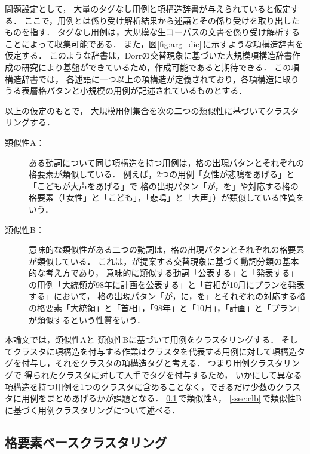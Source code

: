 問題設定として，
大量のタグなし用例と項構造辞書が与えられていると仮定する．
ここで，用例とは係り受け解析結果から述語とその係り受けを取り出したものを指す．
タグなし用例は，大規模な生コーパスの文書を係り受け解析することによって収集可能である．
また，図\ref{fig:arg_dic}\,に示すような項構造辞書を仮定する．
このような辞書は，Dorrの交替現象に基づいた大規模項構造辞書作成の研究により基盤ができているため，作成可能であると期待できる．
この項構造辞書では，
各述語に一つ以上の項構造が定義されており，各項構造に取りうる表層格パタンと小規模の用例が記述されているものとする．

以上の仮定のもとで，
大規模用例集合を次の二つの類似性に基づいてクラスタリングする．

\begin{description}
\item[類似性A：]ある動詞について同じ項構造を持つ用例は，格の出現パタンとそれぞれの格要素が類似している．
例えば，2つの用例「女性が悲鳴をあげる」と「こどもが大声をあげる」で
格の出現パタン「が，を」や対応する格の格要素（「女性」と「こども」，「悲鳴」と「大声」）が類似している性質をいう．
\item[類似性B：]意味的な類似性がある二つの動詞は，格の出現パタンとそれぞれの格要素が類似している．
これは，が提案する交替現象に基づく動詞分類の基本的な考え方であり，
意味的に類似する動詞「公表する」と「発表する」の用例「大統領が98年に計画を公表する」と「首相が10月にプランを発表する」において，
格の出現パタン「が，に，を」とそれぞれの対応する格の格要素「大統領」と「首相」，「98年」と「10月」，「計画」と「プラン」が類似するという性質をいう．

\end{description}



本論文では，類似性Aと
類似性Bに基づいて用例をクラスタリングする．
そしてクラスタに項構造を付与する作業はクラスタを代表する用例に対して項構造タグを付与し，それをクラスタの項構造タグと考える．
つまり用例クラスタリングで
得られたクラスタに対して人手でタグを付与するため，
いかにして異なる項構造を持つ用例を1つのクラスタに含めることなく，できるだけ少数のクラスタに用例をまとめあげるかが課題となる．
\ref{ssec:cla}\,で類似性A，
\ref{ssec:clb}\,で類似性Bに基づく用例クラスタリングについて述べる．



\subsection{格要素ベースクラスタリング}
\label{ssec:cla}

